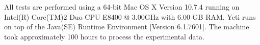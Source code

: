 \documentclass[conference]{IEEEtran}
\begin{document}
%
%
%

All tests are performed using a 64-bit Mac OS X Version 10.7.4 running on Intel(R) Core(TM)2 Duo CPU E8400 @ 3.00GHz with 6.00 GB RAM. Yeti runs on top of the Java(SE) Runtime Environment [Version 6.1.7601]. The machine took approximately 100 hours to process the experimental data.\\


\end{document}
